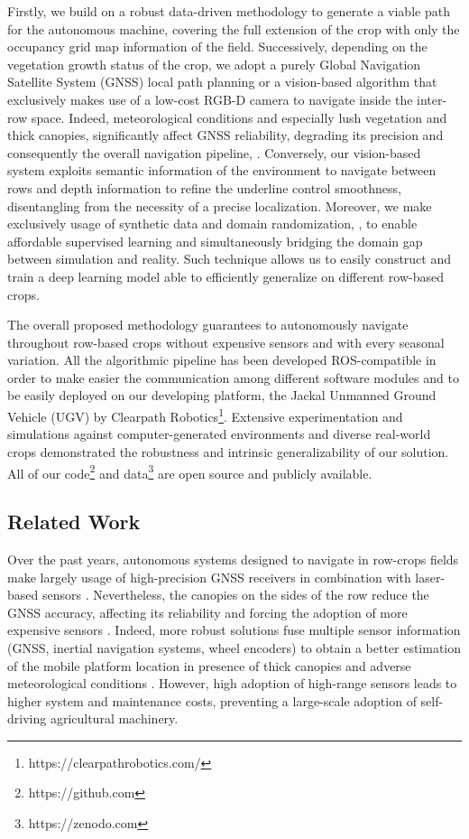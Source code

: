 \documentclass[journal]{IEEEtran}
\begin{document}
Firstly, we build on a robust data-driven methodology to generate a viable path for the autonomous machine, covering the full  extension  of  the  crop  with  only  the  occupancy  grid map  information  of  the  field. Successively, depending on the vegetation growth status of the crop, we adopt a purely Global Navigation Satellite System (GNSS) local path planning or a vision-based algorithm that exclusively makes use of a low-cost RGB-D camera to navigate inside the inter-row space. Indeed, meteorological conditions and especially lush vegetation and thick canopies, significantly affect GNSS reliability, degrading its precision and consequently the overall navigation pipeline, \cite{kabir2016performance, marden2014gps}. Conversely, our vision-based system exploits semantic information of the environment to navigate between rows and depth information to refine the underline control smoothness, disentangling from the necessity of a precise localization. Moreover, we make exclusively usage of synthetic data and domain randomization, \cite{tobin2017domain}, to enable affordable supervised learning and simultaneously bridging the domain gap between simulation and reality. Such technique allows us to easily construct and train a deep learning model able to efficiently generalize on different row-based crops. 

The overall proposed methodology guarantees to autonomously navigate throughout row-based crops without expensive sensors and with every seasonal variation.
All the algorithmic pipeline has been developed ROS-compatible in order to make easier the communication among different software modules and to be easily deployed on our developing
platform, the Jackal Unmanned Ground Vehicle (UGV) by
Clearpath Robotics\footnote{https://clearpathrobotics.com/}. Extensive experimentation and simulations against computer-generated environments and diverse real-world crops demonstrated the robustness and intrinsic generalizability of our solution. All of our code\footnote{https://github.com} and data\footnote{https://zenodo.com}
are open source and publicly available. %
\vspace{-7pt}
\subsection{Related Work}
Over the past years, autonomous systems designed to navigate in row-crops fields make largely usage of high-precision GNSS
receivers  in combination with laser-based sensors \cite{ly2015fully, moorehead2012automating}. Nevertheless, the canopies
on the sides of the row reduce the GNSS accuracy, affecting
its reliability and forcing the adoption of more expensive sensors \cite{kabir2016performance}. Indeed, more robust solutions fuse multiple sensor information (GNSS,  inertial navigation systems, wheel encoders) to obtain a better estimation of the mobile platform location in presence of thick canopies and adverse meteorological conditions \cite{overview_auto_nav_UGV, winterhalter2021localization}. However, high adoption of high-range sensors leads to higher system and maintenance costs, preventing a large-scale adoption of self-driving agricultural machinery. 
\end{document}
